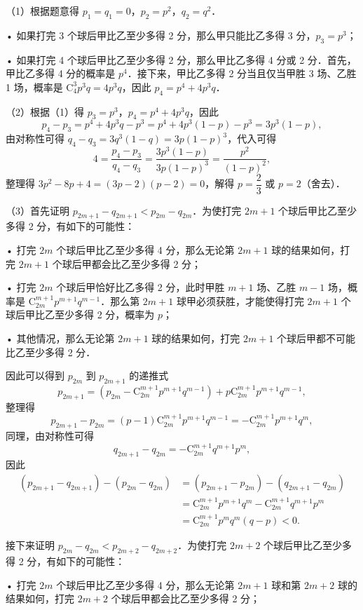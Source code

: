 \begin{solutions}
（1）根据题意得 $p_1=q_1=0$，$p_2=p^2$，$q_2=q^2$．

• 如果打完 3 个球后甲比乙至少多得 2 分，那么甲只能比乙多得 3 分，$p_3=p^3$；

• 如果打完 4 个球后甲比乙至少多得 2 分，那么甲比乙多得 4 分或 2 分．首先，甲比乙多得 4 分的概率是 $p^4$．接下来，甲比乙多得 2 分当且仅当甲胜 3 场、乙胜 1 场，概率是 $\mathrm{C}_4^3p^3q=4p^3q$，因此 $p_4=p^4+4p^3q$．

（2）根据（1）得 $p_3=p^3$，$p_4=p^4+4p^3q$，因此
$$
p_4-p_3=p^4+4p^3q-p^3=p^4+4p^3(1-p)-p^3=3p^3(1-p),
$$
由对称性可得 $q_4-q_3=3q^3(1-q)=3p(1-p)^3$，代入可得
$$
4=\dfrac{p_4-p_3}{q_4-q_3}=\dfrac{3p^3(1-p)}{3p(1-p)^3}=\dfrac{p^2}{(1-p)^2},
$$
整理得 $3p^2-8p+4=(3p-2)(p-2)=0$，解得 $p=\dfrac{2}{3}$ 或 $p=2$（舍去）．

（3）首先证明 $p_{2m+1}-q_{2m+1}<p_{2m}-q_{2m}$．为使打完 $2m+1$ 个球后甲比乙至少多得 2 分，有如下的可能性：

• 打完 $2m$ 个球后甲比乙至少多得 4 分，那么无论第 $2m+1$ 球的结果如何，打完 $2m+1$ 个球后甲都会比乙至少多得 2 分；

• 打完 $2m$ 个球后甲恰好比乙多得 2 分，此时甲胜 $m+1$ 场、乙胜 $m-1$ 场，概率是 $\mathrm{C}_{2m}^{m+1}p^{m+1}q^{m-1}$．那么第 $2m+1$ 球甲必须获胜，才能使得打完 $2m+1$ 个球后甲比乙至少多得 2 分，概率为 $p$；

• 其他情况，那么无论第 $2m+1$ 球的结果如何，打完 $2m+1$ 个球后甲都不可能比乙至少多得 2 分．

因此可以得到 $p_{2m}$ 到 $p_{2m+1}$ 的递推式
$$
p_{2m+1}=\left(p_{2m}-\mathrm{C}_{2m}^{m+1}p^{m+1}q^{m-1}\right)+p\mathrm{C}_{2m}^{m+1}p^{m+1}q^{m-1},
$$
整理得
$$
p_{2m+1}-p_{2m}=(p-1)\mathrm{C}_{2m}^{m+1}p^{m+1}q^{m-1}=-\mathrm{C}_{2m}^{m+1}p^{m+1}q^m,
$$
同理，由对称性可得
$$
q_{2m+1}-q_{2m}=-\mathrm{C}_{2m}^{m+1}q^{m+1}p^m,
$$
因此
\begin{align*}
(p_{2m+1}-q_{2m+1})-(p_{2m}-q_{2m})&=(p_{2m+1}-p_{2m})-(q_{2m+1}-q_{2m})\\
&=\mathrm{C}_{2m}^{m+1}p^{m+1}q^m-\mathrm{C}_{2m}^{m+1}q^{m+1}p^m\\
&=\mathrm{C}_{2m}^{m+1}p^mq^m(q-p)<0.
\end{align*}

接下来证明 $p_{2m}-q_{2m}<p_{2m+2}-q_{2m+2}$．为使打完 $2m+2$ 个球后甲比乙至少多得 2 分，有如下的可能性：

• 打完 $2m$ 个球后甲比乙至少多得 4 分，那么无论第 $2m+1$ 球和第 $2m+2$ 球的结果如何，打完 $2m+2$ 个球后甲都会比乙至少多得 2 分；


\end{solutions}
